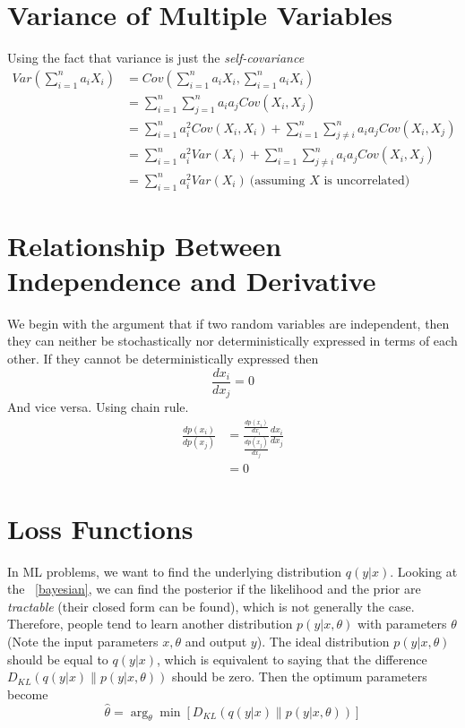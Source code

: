\documentclass{book}
\numberwithin{equation}{subsection}
\begin{document}
\section{Variance of Multiple Variables}
Using the fact that variance is just the \textit{self-covariance}
\begin{align}
    Var(\sum_{i=1}^{n} a_i X_i) &= Cov(\sum_{i=1}^{n} a_i X_i, \sum_{i=1}^{n} a_i X_i)\\
    &= \sum_{i=1}^{n} \sum_{j=1}^{n} a_i a_j Cov(X_i, X_j)\\
    &= \sum_{i=1}^{n} a_i^2 Cov(X_i, X_i) + \sum_{i=1}^{n} \sum_{j \neq i}^{n} a_i a_j Cov(X_i, X_j)\\
    &= \sum_{i=1}^{n} a_i^2 Var(X_i) + \sum_{i=1}^{n} \sum_{j \neq i}^{n} a_i a_j Cov(X_i, X_j)\\
    &= \sum_{i=1}^{n} a_i^2 Var(X_i)\ \text{(assuming $X$ is uncorrelated)}\label{var_derivation_res}
\end{align}
\section{Relationship Between Independence and Derivative}
We begin with the argument that if two random variables are independent, then they can neither be stochastically nor deterministically expressed in terms of each other. If they cannot be deterministically expressed then
\begin{equation}
    \frac{dx_i}{dx_j} = 0
\end{equation}
And vice versa. Using chain rule.
\begin{align}
    \frac{dp(x_i)}{dp(x_j)} &= \frac{\frac{dp(x_i)}{dx_i}}{\frac{dp(x_j)}{dx_j}}\frac{dx_i}{dx_j}\\
    &= 0 \label{prob_independence}
\end{align}
\section{Loss Functions}
\label{lossfun}
In ML problems, we want to find the underlying distribution $q(y|x)$. Looking at the ~\ref{bayesian}, we can find the posterior if the likelihood and the prior are \textit{tractable} (their closed form can be found), which is not generally the case. Therefore, people tend to learn another distribution $p(y|x,\theta)$ with parameters $\theta$ (Note the input parameters $x, \theta$ and output $y$). The ideal distribution $p(y|x,\theta)$ should be equal to $q(y|x)$, which is equivalent to saying that the difference $D_{KL}(q(y|x)\parallel p(y|x,\theta))$ should be zero. Then the optimum parameters become
\begin{equation}
    \hat{\theta}
    = \arg_\theta \min[D_{KL}(q(y|x) \parallel p(y|x,\theta))]
\end{equation}
\end{document}
